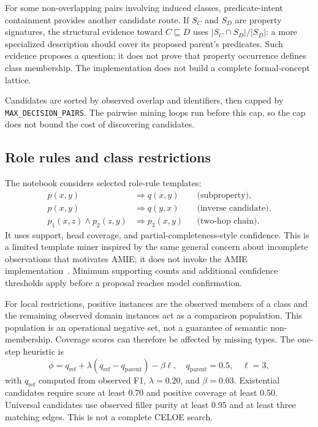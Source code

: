 \documentclass[11pt,a4paper]{article}
\newcommand{\code}[1]{\nolinkurl{#1}}
\begin{document}
For some non-overlapping pairs involving induced classes, predicate-intent
containment provides another candidate route. If $S_C$ and $S_D$ are property
signatures, the structural evidence toward $C\sqsubseteq D$ uses
$|S_C\cap S_D|/|S_D|$: a more specialized description should cover its proposed
parent's predicates. Such evidence proposes a question; it does not prove that
property occurrence defines class membership. The implementation does not build
a complete formal-concept lattice.

Candidates are sorted by observed overlap and identifiers, then capped by
\code{MAX_DECISION_PAIRS}. The pairwise mining loops run before this cap, so the
cap does not bound the cost of discovering candidates.

\subsection{Role rules and class restrictions}
The notebook considers selected role-rule templates:
\begin{align*}
 p(x,y)&\Rightarrow q(x,y) &&\text{(subproperty)},\\
 p(x,y)&\Rightarrow q(y,x) &&\text{(inverse candidate)},\\
 p_1(x,z)\wedge p_2(z,y)&\Rightarrow p_3(x,y) &&\text{(two-hop chain)}.
\end{align*}
It uses support, head coverage, and partial-completeness-style confidence.
This is a limited template miner inspired by the same general concern about
incomplete observations that motivates AMIE; it does not invoke the AMIE
implementation~\cite{amie}. Minimum supporting counts and additional confidence
thresholds apply before a proposal reaches model confirmation.

For local restrictions, positive instances are the observed members of a class
and the remaining observed domain instances act as a comparison population.
This population is an operational negative set, not a guarantee of semantic
non-membership. Coverage scores can therefore be affected by missing types.
The one-step heuristic is
\[
 \phi=q_{\mathrm{ref}}+\lambda(q_{\mathrm{ref}}-q_{\mathrm{parent}})
             -\beta\ell,
 \quad q_{\mathrm{parent}}=0.5,\quad \ell=3,
\]
with $q_{\mathrm{ref}}$ computed from observed F1, $\lambda=0.20$, and
$\beta=0.03$. Existential candidates require score at least 0.70 and positive
coverage at least 0.50. Universal candidates use observed filler purity at least
0.95 and at least three matching edges. This is not a complete CELOE search.
\end{document}

